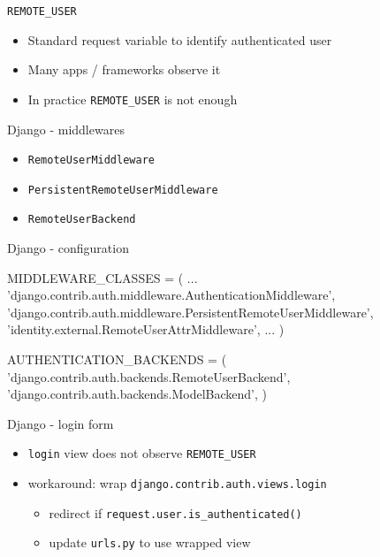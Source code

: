 \documentclass[ignorenonframetext,aspectratio=169]{beamer}
\newenvironment{Shaded}{}{}
\newcommand{\StringTok}[1]{\textcolor[rgb]{0.25,0.44,0.63}{{#1}}}
\newcommand{\OperatorTok}[1]{\textcolor[rgb]{0.40,0.40,0.40}{{#1}}}
\newcommand{\NormalTok}[1]{{#1}}
\providecommand{\tightlist}{%
  \setlength{\itemsep}{0pt}\setlength{\parskip}{0pt}}
\begin{document}
\begin{frame}{\tt REMOTE\_USER}
\begin{itemize}
\tightlist
\item Standard request variable to identify authenticated user
\item Many apps / frameworks observe it
\item In practice {\tt REMOTE\_USER} is not enough
\end{itemize}
\end{frame}

\begin{frame}{Django - middlewares}
\begin{itemize}
\tightlist

\item {\tt RemoteUserMiddleware}
\item {\tt PersistentRemoteUserMiddleware}
\item {\tt RemoteUserBackend}

\end{itemize}
\end{frame}

\begin{frame}[fragile]{Django - configuration}
\begin{Shaded}
\begin{Highlighting}[]
\NormalTok{MIDDLEWARE_CLASSES }\OperatorTok{=} \NormalTok{(}
 \NormalTok{...}
 \StringTok{'django.contrib.auth.middleware.AuthenticationMiddleware'}\NormalTok{,}
 \StringTok{'django.contrib.auth.middleware.PersistentRemoteUserMiddleware'}\NormalTok{,}
 \StringTok{'identity.external.RemoteUserAttrMiddleware'}\NormalTok{,}
 \NormalTok{...}
\NormalTok{)}

\NormalTok{AUTHENTICATION_BACKENDS }\OperatorTok{=} \NormalTok{(}
  \StringTok{'django.contrib.auth.backends.RemoteUserBackend'}\NormalTok{,}
  \StringTok{'django.contrib.auth.backends.ModelBackend'}\NormalTok{,}
\NormalTok{)}
\end{Highlighting}
\end{Shaded}
\end{frame}

\begin{frame}{Django - login form}
\begin{itemize}
\tightlist

\item {\tt login} view does not observe {\tt REMOTE\_USER}

\item workaround: wrap {\tt django.contrib.auth.views.login}

    \begin{itemize}
    \tightlist
    \item redirect if {\tt request.user.is\_authenticated()}
    \item update {\tt urls.py} to use wrapped view
    \end{itemize}

\end{itemize}
\end{frame}
\end{document}
